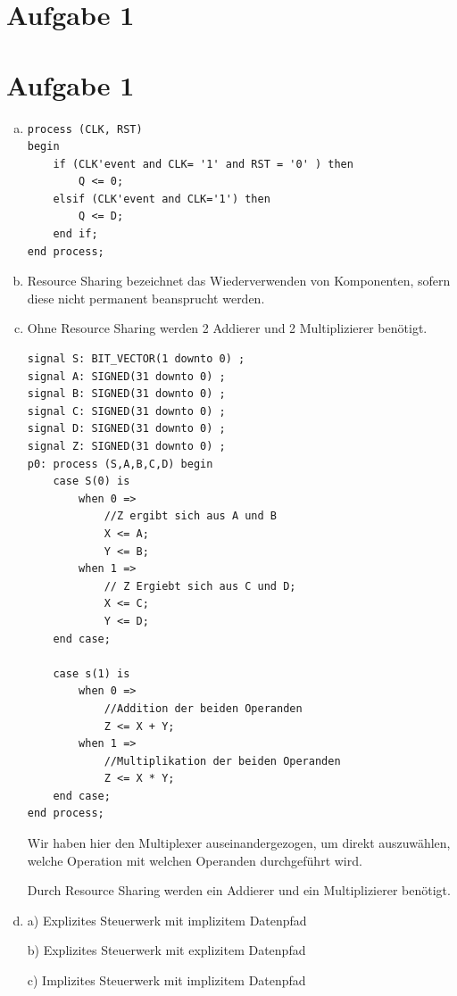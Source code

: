 \documentclass[a4paper]{scrartcl}
\begin{document}
	
	\section*{Aufgabe 1}
		\section*{Aufgabe 1}
	
	\begin{enumerate}[(a)]
		
		\item 
		
		\begin{lstlisting}
process (CLK, RST)
begin 
	if (CLK'event and CLK= '1' and RST = '0' ) then 
		Q <= 0; 
	elsif (CLK'event and CLK='1') then 
		Q <= D; 
	end if; 
end process; 
		\end{lstlisting}
		
		\item Resource Sharing bezeichnet das Wiederverwenden von Komponenten, sofern diese nicht permanent beansprucht werden. 
				
		\item Ohne Resource Sharing werden 2 Addierer und 2 Multiplizierer benötigt.	
		
		\begin{lstlisting}
signal S: BIT_VECTOR(1 downto 0) ; 
signal A: SIGNED(31 downto 0) ; 
signal B: SIGNED(31 downto 0) ; 
signal C: SIGNED(31 downto 0) ; 
signal D: SIGNED(31 downto 0) ; 
signal Z: SIGNED(31 downto 0) ; 
p0: process (S,A,B,C,D) begin 
	case S(0) is 
		when 0 => 
			//Z ergibt sich aus A und B
			X <= A;
			Y <= B;
		when 1 => 
			// Z Ergiebt sich aus C und D; 
			X <= C;
			Y <= D;
	end case;
	
	case s(1) is
		when 0 =>
			//Addition der beiden Operanden
			Z <= X + Y;
		when 1 =>
			//Multiplikation der beiden Operanden
			Z <= X * Y;
	end case;
end process;		
		\end{lstlisting}
		
		Wir haben hier den Multiplexer auseinandergezogen, um direkt auszuwählen, welche Operation mit welchen Operanden durchgeführt wird.
		
		
		Durch Resource Sharing werden ein Addierer und ein Multiplizierer benötigt.
		
		\item
		
		a) Explizites Steuerwerk mit implizitem Datenpfad
		
		b) Explizites Steuerwerk mit explizitem Datenpfad
		
		c) Implizites Steuerwerk mit implizitem Datenpfad
		
	\end{enumerate}	
	
\end{document}
